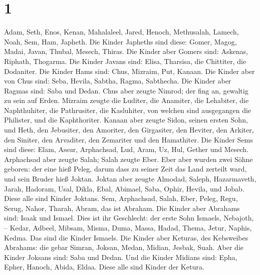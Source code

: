 \hypertarget{section}{%
\section{1}\label{section}}

 Adam, Seth, Enos,  Kenan, Mahalaleel, Jared,
 Henoch, Methusalah, Lamech,  Noah, Sem, Ham,
Japheth.  Die Kinder Japheths sind diese: Gomer, Magog,
Madai, Javan, Thubal, Mesech, Thiras.  Die Kinder aber
Gomers sind: Askenas, Riphath, Thogarma.  Die Kinder Javans
sind: Elisa, Tharsisa, die Chittiter, die Dodaniter.  Die
Kinder Hams sind: Chus, Mizraim, Put, Kanaan.  Die Kinder
aber von Chus sind: Seba, Hevila, Sabtha, Ragma, Sabthecha. Die Kinder
aber Ragmas sind: Saba und Dedan.  Chus aber zeugte Nimrod;
der fing an, gewaltig zu sein auf Erden.  Mizraim zeugte
die Luditer, die Anamiter, die Lehabiter, die Naphthuhiter,
 die Pathrusiter, die Kasluhiter, von welchen sind
ausgegangen die Philister, und die Kaphthoriter.  Kanaan
aber zeugte Sidon, seinen ersten Sohn, und Heth,  den
Jebusiter, den Amoriter, den Girgasiter,  den Heviter, den
Arkiter, den Siniter,  den Arvaditer, den Zemariter und den
Hamathiter.  Die Kinder Sems sind diese: Elam, Assur,
Arphachsad, Lud, Aram, Uz, Hul, Gether und Mesech. 
Arphachsad aber zeugte Salah; Salah zeugte Eber.  Eber aber
wurden zwei Söhne geboren: der eine hieß Peleg, darum dass zu seiner
Zeit das Land zerteilt ward, und sein Bruder hieß Joktan. 
Joktan aber zeugte Almodad, Saleph, Hazarmaveth, Jarah, 
Hadoram, Usal, Dikla,  Ebal, Abimael, Saba, 
Ophir, Hevila, und Jobab. Diese alle sind Kinder Joktans. 
Sem, Arphachsad, Salah,  Eber, Peleg, Regu, 
Serug, Nahor, Tharah,  Abram, das ist Abraham.
 Die Kinder aber Abrahams sind: Isaak und Ismael.
 Dies ist ihr Geschlecht: der erste Sohn Ismaels, Nebajoth,
-- Kedar, Adbeel, Mibsam,  Misma, Duma, Massa, Hadad,
Thema,  Jetur, Naphis, Kedma. Das sind die Kinder Ismaels.
 Die Kinder aber Keturas, des Kebsweibes Abrahams: die
gebar Simran, Joksan, Medan, Midian, Jesbak, Suah. Aber die Kinder
Joksans sind: Saba und Dedan.  Und die Kinder Midians sind:
Epha, Epher, Hanoch, Abida, Eldaa. Diese alle sind Kinder der Ketura.
